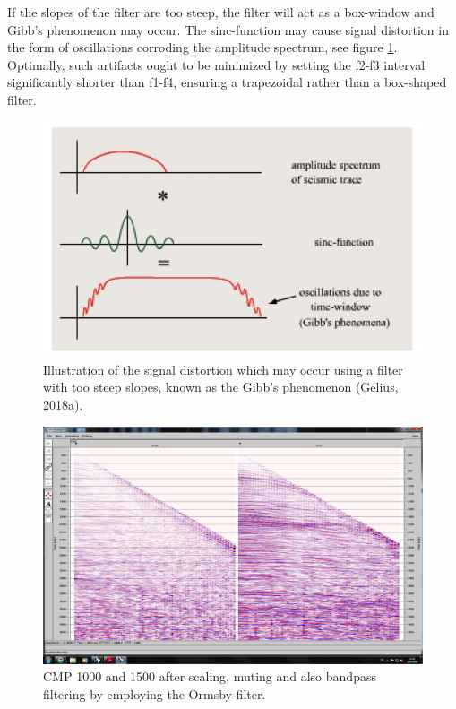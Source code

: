 \documentclass[10pt,a4paper]{article}
\begin{document}
\noindent If the slopes of the filter are too steep, the filter will act as a box-window and Gibb’s phenomenon may occur. The sinc-function may cause signal distortion in the form of oscillations corroding the amplitude spectrum, see figure \ref{fig10}. Optimally, such artifacts ought to be minimized by setting the f2-f3 interval significantly shorter than f1-f4, ensuring a trapezoidal rather than a box-shaped filter.

\begin{figure}[H]
\includegraphics[width=\textwidth]{fig10.jpg}
\caption{Illustration of the signal distortion which may occur using a filter with too steep slopes, known as the Gibb’s phenomenon (Gelius, 2018a).}
\label{fig10}
\end{figure}


\begin{figure}[H]
\includegraphics[width=\textwidth, trim={1.5cm 1.5cm 1cm 1.5cm},clip]{fig11.jpg}
\caption{CMP 1000 and 1500 after scaling, muting and also bandpass filtering by employing the Ormsby-filter.}
\label{fig11}
\end{figure}
\end{document}
